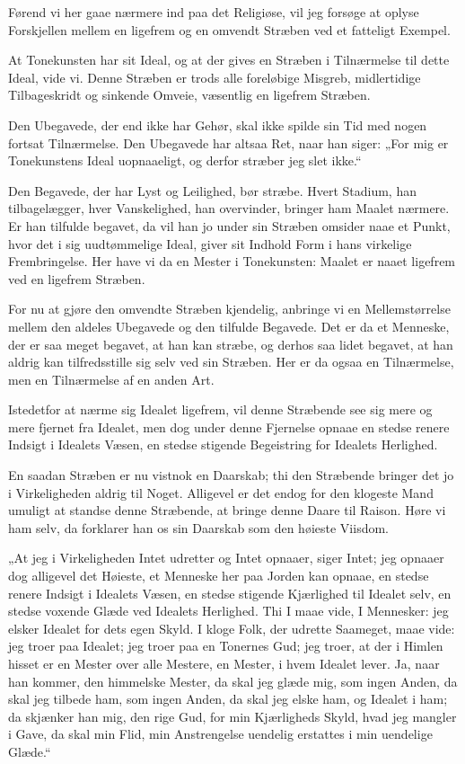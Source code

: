 \documentclass[12pt,a4paper]{book}
\newcommand{\apage}[1]{\marginnote{\footnotesize\textit{[#1]}}}
\begin{document}
Førend vi her gaae nærmere ind paa det Religiøse, vil jeg forsøge at
oplyse Forskjellen mellem en ligefrem og en omvendt Stræben ved
et fatteligt Exempel.

At Tonekunsten har sit Ideal, og at der gives en Stræben i
Tilnærmelse til dette Ideal, vide vi. Denne Stræben er trods alle
foreløbige Misgreb, midlertidige Tilbageskridt og sinkende Omveie,
væsentlig en ligefrem Stræben.

Den Ubegavede, der end ikke har Gehør, skal ikke spilde sin Tid
med nogen fortsat Tilnærmelse. Den Ubegavede har altsaa Ret, naar
han siger: „For mig er Tonekunstens Ideal uopnaaeligt, og derfor
stræber jeg slet ikke.“

Den Begavede, der har Lyst og Leilighed, bør stræbe. Hvert
Stadium, han tilbagelægger, hver Vanskelighed, han overvinder,
bringer ham Maalet nærmere. Er han tilfulde begavet, da vil han jo
under sin Stræben omsider naae et Punkt, hvor det i sig
uudtømmelige Ideal, giver sit Indhold Form i hans virkelige
Frembringelse. Her have vi da en Mester i Tonekunsten: Maalet er
naaet ligefrem ved en ligefrem Stræben.

For nu at gjøre den omvendte Stræben kjendelig, anbringe vi en
Mellemstørrelse mellem den aldeles Ubegavede og \apage{140}
den tilfulde Begavede. Det er da et Menneske, der er saa meget
begavet, at han kan stræbe, og derhos saa lidet begavet, at han
aldrig kan tilfredsstille sig selv ved sin Stræben. Her er da ogsaa en
Tilnærmelse, men en Tilnærmelse af en anden Art.

Istedetfor at nærme sig Idealet ligefrem, vil denne Stræbende see
sig mere og mere fjernet fra Idealet, men dog under denne
Fjernelse opnaae en stedse renere Indsigt i Idealets Væsen, en
stedse stigende Begeistring for Idealets Herlighed.

En saadan Stræben er nu vistnok en Daarskab; thi den Stræbende
bringer det jo i Virkeligheden aldrig til Noget. Alligevel er det
endog for den klogeste Mand umuligt at standse denne Stræbende,
at bringe denne Daare til Raison. Høre vi ham selv, da forklarer
han os sin Daarskab som den høieste Viisdom.

„At jeg i Virkeligheden Intet udretter og Intet opnaaer, siger Intet;
jeg opnaaer dog alligevel det Høieste, et Menneske her paa Jorden
kan opnaae, en stedse renere Indsigt i Idealets Væsen, en stedse
stigende Kjærlighed til Idealet selv, en stedse voxende Glæde ved
Idealets Herlighed. Thi I maae vide, I Mennesker: jeg elsker Idealet
for dets egen Skyld. I kloge Folk, der udrette Saameget, maae vide:
jeg troer paa Idealet; jeg troer paa en Tonernes Gud; jeg troer, at
der i Himlen hisset er en Mester over alle Mestere, en Mester, i
hvem Idealet lever. Ja, naar han kommer, den himmelske Mester, da
skal jeg glæde mig, som ingen Anden, da skal jeg tilbede ham, som
ingen Anden, da skal jeg elske ham, og Idealet i ham; da skjænker
han mig, den rige Gud, for min Kjærligheds Skyld, hvad jeg
mangler i Gave, da skal min Flid, min Anstrengelse uendelig
erstattes i min uendelige Glæde.“
\end{document}
